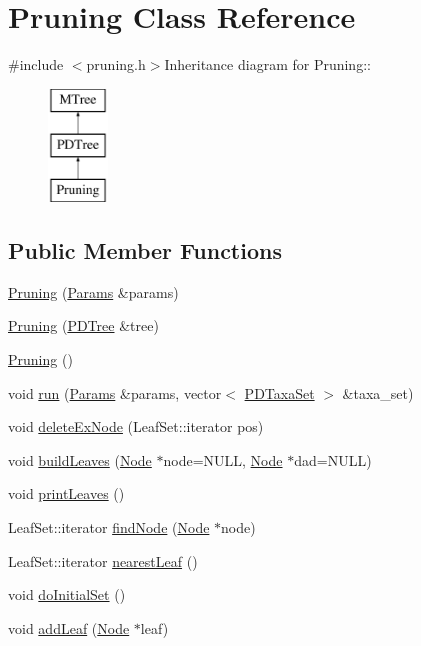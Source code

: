 \hypertarget{classPruning}{
\section{Pruning Class Reference}
\label{classPruning}
}


{\ttfamily \#include $<$pruning.h$>$}Inheritance diagram for Pruning::\begin{figure}[H]
\begin{center}
\leavevmode
\includegraphics[height=3cm]{classPruning}
\end{center}
\end{figure}
\subsection*{Public Member Functions}
\begin{DoxyCompactItemize}
\item 
\hyperlink{classPruning_a020fa8f3cef1e1119e534c5b6f0c8fae}{Pruning} (\hyperlink{structParams}{Params} \&params)
\item 
\hyperlink{classPruning_a4dd4ec835b284391a7260e3cd6b4491d}{Pruning} (\hyperlink{classPDTree}{PDTree} \&tree)
\item 
\hyperlink{classPruning_a71d6f0210e5083b0eded402c165431b7}{Pruning} ()
\item 
void \hyperlink{classPruning_a9ee0d53c821bfca89ebe57f090eeba99}{run} (\hyperlink{structParams}{Params} \&params, vector$<$ \hyperlink{classPDTaxaSet}{PDTaxaSet} $>$ \&taxa\_\-set)
\item 
void \hyperlink{classPruning_ab3423a1002c0eb4af4568f9accac93fa}{deleteExNode} (LeafSet::iterator pos)
\item 
void \hyperlink{classPruning_aeb07f089da3792788648d2b8d7d702ca}{buildLeaves} (\hyperlink{classNode}{Node} $\ast$node=NULL, \hyperlink{classNode}{Node} $\ast$dad=NULL)
\item 
void \hyperlink{classPruning_ae0e583aa4e812cdce06af4cc634e0110}{printLeaves} ()
\item 
LeafSet::iterator \hyperlink{classPruning_a973dc17e371f5104adef79f4c227e81a}{findNode} (\hyperlink{classNode}{Node} $\ast$node)
\item 
LeafSet::iterator \hyperlink{classPruning_a9cf587b15c0bcabf01531a916d2338d5}{nearestLeaf} ()
\item 
void \hyperlink{classPruning_a03ad4c7dce2fee530783d4b783ac32e4}{doInitialSet} ()
\item 
void \hyperlink{classPruning_a6000133f6408dba298337f873dd1d165}{addLeaf} (\hyperlink{classNode}{Node} $\ast$leaf)
\end{DoxyCompactItemize}
